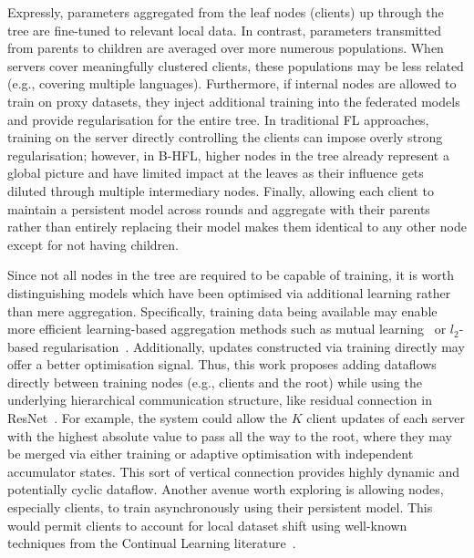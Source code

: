 Expressly, parameters aggregated from the leaf nodes (clients) up through the tree are fine-tuned to relevant local data. In contrast, parameters transmitted from parents to children are averaged over more numerous populations. When servers cover meaningfully clustered clients, these populations may be less related (e.g., covering multiple languages). Furthermore, if internal nodes are allowed to train on proxy datasets, they inject additional training into the federated models and provide regularisation for the entire tree. In traditional FL approaches, training on the server directly controlling the clients can impose overly strong regularisation; however, in B-HFL, higher nodes in the tree already represent a global picture and have limited impact at the leaves as their influence gets diluted through multiple intermediary nodes. Finally, allowing each client to maintain a persistent model across rounds and aggregate with their parents rather than entirely replacing their model makes them identical to any other node except for not having children.

Since not all nodes in the tree are required to be capable of training, it is worth distinguishing models which have been optimised via additional learning rather than mere aggregation. Specifically, training data being available may enable more efficient learning-based aggregation methods such as mutual learning~\citep{DeepMutualLearning} or $l_2$-based regularisation~\citep{Ditto}. Additionally, updates constructed via training directly may offer a better optimisation signal. Thus, this work proposes adding dataflows directly between training nodes (e.g., clients and the root) while using the underlying hierarchical communication structure, like residual connection in ResNet~\citep{ResNet}. For example, the system could allow the $K$ client updates of each server with the highest absolute value to pass all the way to the root, where they may be merged via either training or adaptive optimisation with independent accumulator states. This sort of vertical connection provides highly dynamic and potentially cyclic dataflow. Another avenue worth exploring is allowing nodes, especially clients, to train asynchronously using their persistent model. This would permit clients to account for local dataset shift using well-known techniques from the Continual Learning literature~\citep{ContinualLearningSurvey,LearningWithoutForgetting,kirkpatrick2017overcoming}.

